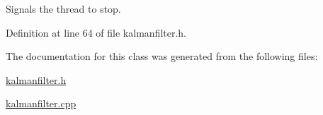 \-Signals the thread to stop. 



\-Definition at line 64 of file kalmanfilter.\-h.



\-The documentation for this class was generated from the following files\-:\begin{DoxyCompactItemize}
\item 
\hyperlink{kalmanfilter_8h}{kalmanfilter.\-h}\item 
\hyperlink{kalmanfilter_8cpp}{kalmanfilter.\-cpp}\end{DoxyCompactItemize}
